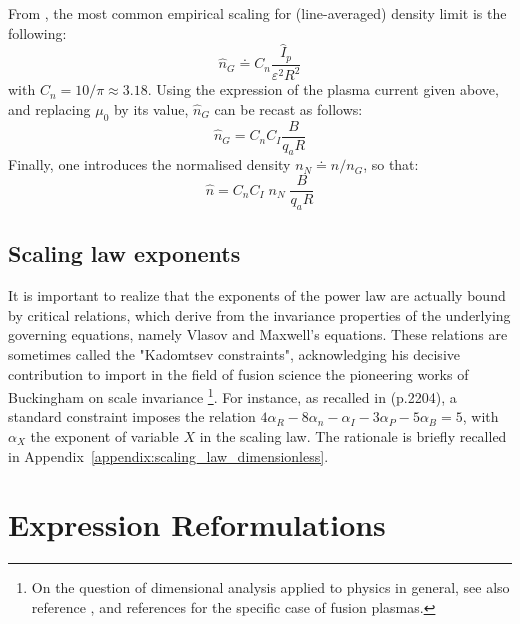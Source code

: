 From \cite[eq.(14.146)]{Freidberg2007}, the most common empirical scaling for (line-averaged) density limit is the following:
\begin{equation}
\hat n_G \doteq C_n \frac{\hat I_p}{\varepsilon^2 R^2}
\label{eqn:greenwald_density_adv}
\end{equation}
with $C_n = 10/\pi \approx 3.18$.
Using the expression of the plasma current given above, and replacing $\mu_0$ by its value, $\hat n_G$ can be recast as follows:
\begin{equation*}
\hat n_G = C_nC_I \frac{B}{q_aR}
\end{equation*}
Finally, one introduces the normalised density $n_N\doteq n/ n_G$, so that:
\begin{equation}
\hat n = C_nC_I\; n_N\; \frac{B}{q_aR}
\label{eq:n_nN_adv}
\end{equation}


\section{Scaling law exponents}
It is important to realize that the exponents of the power law are actually bound by critical relations, which derive from the invariance properties of the underlying governing equations, namely Vlasov and Maxwell's equations. These relations are sometimes called the "Kadomtsev constraints", acknowledging his decisive contribution  to import in the field of fusion science the pioneering works of Buckingham on scale invariance \footnote{On the question of dimensional analysis applied to physics in general, see also reference \cite{Misic2010}, and references \cite{Connor1977, Luce2008} for the specific case of fusion plasmas.}. For instance, as recalled in \cite{ITERphysics_chap2} (p.2204), a standard constraint imposes the relation 
$4\alpha_R - 8\alpha_n - \alpha_I - 3\alpha_P - 5\alpha_B = 5$, with $\alpha_X$ the exponent of variable $X$ in the scaling law. The rationale is briefly recalled in Appendix~\ref{appendix:scaling_law_dimensionless}.

\chapter{Expression Reformulations}\margintoc
